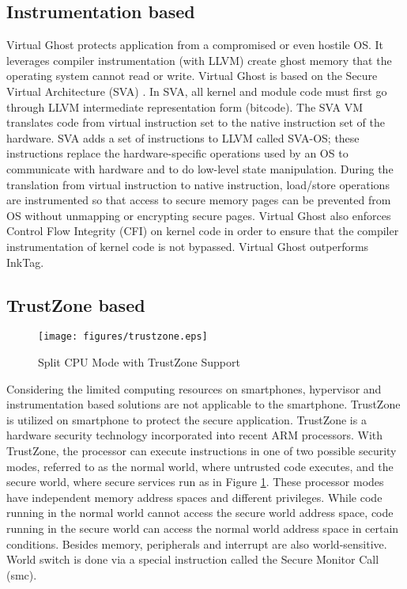 \subsection{Instrumentation based}

Virtual Ghost protects application from a compromised or even hostile OS. It
leverages compiler instrumentation (with LLVM) create ghost memory that the
operating system cannot read or write. Virtual Ghost is based on the Secure
Virtual Architecture (SVA) \cite{SVA}. In SVA, all kernel and module code must
first go through LLVM intermediate representation form (bitcode). The SVA VM
translates code from virtual instruction set to the native instruction set of
the hardware. SVA adds a set of instructions to LLVM called SVA-OS; these
instructions replace the hardware-specific operations used by an OS to
communicate with hardware and to do low-level state manipulation. During the
translation from virtual instruction to native instruction, load/store
operations are instrumented so that access to secure memory pages can be
prevented from OS without unmapping or encrypting secure pages. Virtual Ghost
also enforces Control Flow Integrity (CFI) \cite{CFI} on kernel code in order
to ensure that the compiler instrumentation of kernel code is not bypassed.
Virtual Ghost outperforms InkTag.

\subsection{TrustZone based}

\begin{figure}[htb]
\centering
\texttt{[image: figures/trustzone.eps]}
\caption{Split CPU Mode with TrustZone Support}
\label{fig:trustzone}
\end{figure}

Considering the limited computing resources on smartphones, hypervisor and
instrumentation based solutions are not applicable to the smartphone. TrustZone
\cite{trustzone} is utilized on smartphone to protect the secure application.
TrustZone is a hardware security technology incorporated into recent ARM
processors. With TrustZone, the processor can execute instructions in one of
two possible security modes, referred to as the normal world, where untrusted
code executes, and the secure world, where secure services run as in Figure
\ref{fig:trustzone}. These processor modes have independent memory address
spaces and different privileges. While code running in the normal world cannot
access the secure world address space, code running in the secure world can
access the normal world address space in certain conditions. Besides memory,
peripherals and interrupt are also world-sensitive. World switch is done via a
special instruction called the Secure Monitor Call (smc).

